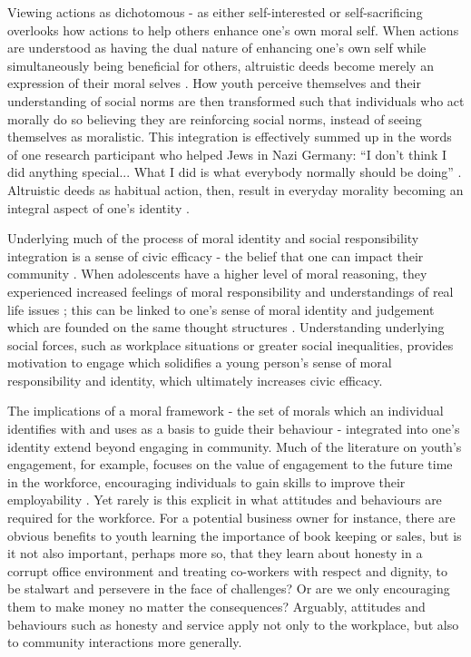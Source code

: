 Viewing actions as dichotomous - as either self-interested or self-sacrificing overlooks how actions to help others enhance one's own moral self. When actions are understood as having the dual nature of enhancing one's own self while simultaneously being beneficial for others, altruistic deeds become merely an expression of their moral selves \citep[][see also \citealp{Colby1999}]{Youniss1999a}. How youth perceive themselves and their understanding of social norms are then transformed such that individuals who act morally do so believing they are reinforcing social norms, instead of seeing themselves as moralistic. This integration is effectively summed up in the words of one research participant who helped Jews in Nazi Germany: “I don't think I did anything special... What I did is what everybody normally should be doing” \citep[][p213]{Monroe1994}. Altruistic deeds as habitual action, then, result in everyday morality becoming an integral aspect of one's identity \citep{Youniss1999a}. 

Underlying much of the process of moral identity and social responsibility integration is a sense of civic efficacy - the belief that one can impact their community \citep{Crocetti2012}. When adolescents have a higher level of moral reasoning, they experienced increased feelings of moral responsibility and understandings of real life issues \citep{VanGoethem2012}; this can be linked to one's sense of moral identity and judgement which are founded on the same thought structures \citep{Davidson1991}. Understanding underlying social forces, such as workplace situations or greater social inequalities, provides motivation to engage which solidifies a young person's sense of moral responsibility and identity, which ultimately increases civic efficacy. 

The implications of a moral framework - the set of morals which an individual identifies with and uses as a basis to guide their behaviour - integrated into one's identity extend beyond engaging in community. Much of the literature on youth's engagement, for example, focuses on the value of engagement to the future time in the workforce, encouraging individuals to gain skills to improve their employability \citep{Shukra2012}. Yet rarely is this explicit in what attitudes and behaviours are required for the workforce. For a potential business owner for instance, there are obvious benefits to youth learning the importance of book keeping or sales, but is it not also important, perhaps more so, that they learn about honesty in a corrupt office environment and treating co-workers with respect and dignity, to be stalwart and persevere in the face of challenges? Or are we only encouraging them to make money no matter the consequences? Arguably, attitudes and behaviours such as honesty and service apply not only to the workplace, but also to community interactions more generally.


